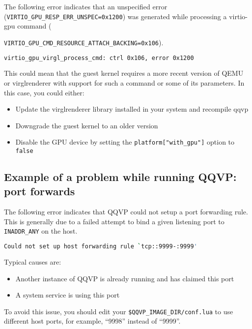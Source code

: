 The following error indicates that an unspecified error ({\small{\lstinline!VIRTIO_GPU_RESP_ERR_UNSPEC=0x1200!}})
was generated while processing a virtio-gpu command ({\mbox{{\small{\lstinline!VIRTIO_GPU_CMD_RESOURCE_ATTACH_BACKING=0x106!}}}).

\small
\begin{lstlisting}[language=bash]
    virtio_gpu_virgl_process_cmd: ctrl 0x106, error 0x1200
\end{lstlisting}
\normalsize

This could mean that the guest kernel requires a more recent version of QEMU or
virglrenderer with support for such a command or some of its parameters.
In this case, you could either:

\begin{itemize}
\item Update the virglrenderer library installed in your system and recompile qqvp
\item Downgrade the guest kernel to an older version
\item Disable the GPU device by setting the {\small{\lstinline!platform["with_gpu"]!}} option to {\small{\lstinline!false!}}
\end{itemize}

\clearpage
\subsection{Example of a problem while running QQVP: port forwards}
\label{sec:portForwards}

The following error indicates that QQVP could not setup a port forwarding
rule. This is generally due to a failed attempt to bind a given listening port
to {\small{\lstinline!INADDR_ANY!}} on the host.

\small
\begin{lstlisting}[language=bash]
    Could not set up host forwarding rule `tcp::9999-:9999'
\end{lstlisting}
\normalsize

Typical causes are:
\begin{itemize}
\item Another instance of QQVP is already running and has claimed this port
\item A system service is using this port
\end{itemize}

To avoid this issue, you should edit your
{\small{\lstinline!$QQVP_IMAGE_DIR/conf.lua!}} to use different host ports,
for example, ``9998'' instead of ``9999''.

}
